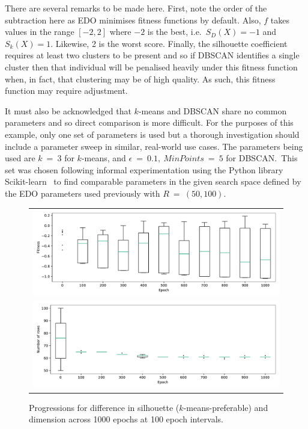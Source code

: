 \documentclass[smallextended]{svjour3}
\newlength{\imgwidth}
\begin{document}
There are several remarks to be made here. First, note the order of the
subtraction here as EDO minimises fitness functions by default. Also, \(f\)
takes values in the range \([-2, 2]\) where \(-2\) is the best, i.e.\ \(S_D(X) =
-1\) and \(S_k(X) = 1\). Likewise, 2 is the worst score. Finally, the silhouette
coefficient requires at least two clusters to be present and so if DBSCAN
identifies a single cluster then that individual will be penalised heavily under
this fitness function when, in fact, that clustering may be of high quality. As
such, this fitness function may require adjustment.

It must also be acknowledged that \(k\)-means and DBSCAN share no common
parameters and so direct comparison is more difficult. For the purposes of this
example, only one set of parameters is used but a thorough investigation should
include a parameter sweep in similar, real-world use cases. The parameters being
used are \(k~=~3\) for \(k\)-means, and \(\epsilon~=~0.1,\ MinPoints~=~5\) for
DBSCAN.\ This set was chosen following informal experimentation using the Python
library Scikit-learn~\cite{scikit} to find comparable parameters in the given
search space defined by the EDO parameters used previously with
\(R~=~(50,100)\).

\begin{figure}[htbp]
    \centering
    \begin{tabular}{c}
        \includegraphics[width=\imgwidth]{Fig11-1.pdf}
        \\
        \includegraphics[width=\imgwidth]{Fig11-2.pdf}
    \end{tabular}
    \caption{%
        Progressions for difference in silhouette (\(k\)-means-preferable) and
        dimension across 1000 epochs at 100 epoch intervals.
    }\label{fig:dbscan-silhouette}
\end{figure}
\end{document}
